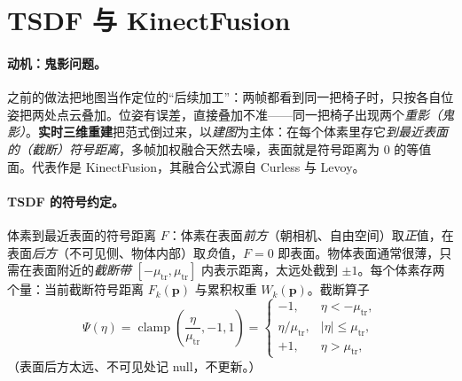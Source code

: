 \section{TSDF 与 KinectFusion}
\label{sec:dense-tsdf}

\paragraph{动机：鬼影问题。}
之前的做法把地图当作定位的“后续加工”：两帧都看到同一把椅子时，只按各自位姿把两处点云叠加。位姿有误差，直接叠加不准——同一把椅子出现两个\emph{重影（鬼影）}\cite{gaoxiang2019slam14}。\textbf{实时三维重建}把范式倒过来，以\emph{建图}为主体：在每个体素里存它\emph{到最近表面的（截断）符号距离}，多帧加权融合天然去噪，表面就是符号距离为 0 的等值面。代表作是 KinectFusion\cite{newcombe2011kinectfusion}，其融合公式源自 Curless 与 Levoy\cite{curless1996volumetric}。

\paragraph{TSDF 的符号约定。}
体素到最近表面的符号距离 $F$：体素在表面\emph{前方}（朝相机、自由空间）取\emph{正}值，在表面\emph{后方}（不可见侧、物体内部）取\emph{负}值，$F=0$ 即表面。物体表面通常很薄，只需在表面附近的\emph{截断带} $[-\mu_{\mathrm{tr}},\mu_{\mathrm{tr}}]$ 内表示距离，太远处截到 $\pm 1$。每个体素存两个量：当前截断符号距离 $F_k(\mathbf{p})$ 与累积权重 $W_k(\mathbf{p})$。截断算子
\begin{equation}
  \Psi(\eta)=\operatorname{clamp}\!\left(\frac{\eta}{\mu_{\mathrm{tr}}},-1,1\right)=
  \begin{cases}-1,&\eta<-\mu_{\mathrm{tr}},\\ \eta/\mu_{\mathrm{tr}},&|\eta|\le\mu_{\mathrm{tr}},\\ +1,&\eta>\mu_{\mathrm{tr}},\end{cases}
  \label{eq:dense-tsdf-trunc}
\end{equation}
（表面后方太远、不可见处记 null，不更新。）

